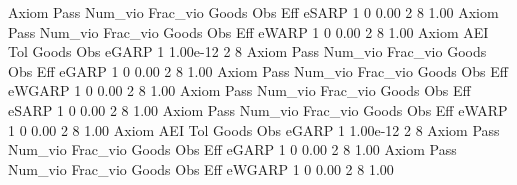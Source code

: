 {\smallskip}
       Axiom {\VBAR} Pass     Num_vio    Frac_vio       Goods         Obs         Eff  
       eSARP {\VBAR}    1           0        0.00           2           8        1.00  
{\smallskip}
{\smallskip}
{\smallskip}
       Axiom {\VBAR} Pass     Num_vio    Frac_vio       Goods         Obs         Eff  
       eWARP {\VBAR}    1           0        0.00           2           8        1.00  
{\smallskip}
       Axiom {\VBAR}       AEI        Tol      Goods        Obs 
       eGARP {\VBAR}         1   1.00e-12          2          8 
{\smallskip}
{\smallskip}
{\smallskip}
       Axiom {\VBAR} Pass     Num_vio    Frac_vio       Goods         Obs         Eff  
       eGARP {\VBAR}    1           0        0.00           2           8        1.00  
{\smallskip}
{\smallskip}
{\smallskip}
       Axiom {\VBAR} Pass     Num_vio    Frac_vio       Goods         Obs         Eff  
      eWGARP {\VBAR}    1           0        0.00           2           8        1.00  
{\smallskip}
{\smallskip}
{\smallskip}
       Axiom {\VBAR} Pass     Num_vio    Frac_vio       Goods         Obs         Eff  
       eSARP {\VBAR}    1           0        0.00           2           8        1.00  
{\smallskip}
{\smallskip}
{\smallskip}
       Axiom {\VBAR} Pass     Num_vio    Frac_vio       Goods         Obs         Eff  
       eWARP {\VBAR}    1           0        0.00           2           8        1.00  
{\smallskip}
       Axiom {\VBAR}       AEI        Tol      Goods        Obs 
       eGARP {\VBAR}         1   1.00e-12          2          8 
{\smallskip}
{\smallskip}
{\smallskip}
       Axiom {\VBAR} Pass     Num_vio    Frac_vio       Goods         Obs         Eff  
       eGARP {\VBAR}    1           0        0.00           2           8        1.00  
{\smallskip}
{\smallskip}
{\smallskip}
       Axiom {\VBAR} Pass     Num_vio    Frac_vio       Goods         Obs         Eff  
      eWGARP {\VBAR}    1           0        0.00           2           8        1.00  

